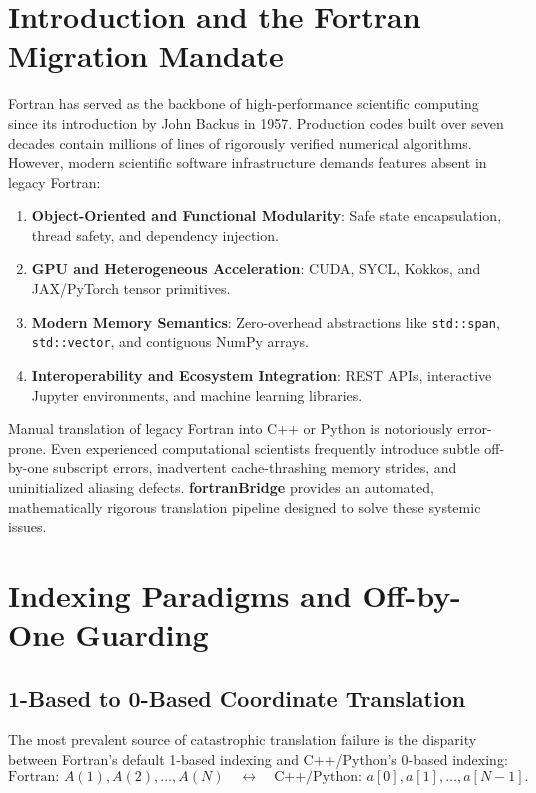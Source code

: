 \documentclass[11pt,a4paper]{article}
\theoremstyle{definition}
\begin{document}
\section{Introduction and the Fortran Migration Mandate}

Fortran has served as the backbone of high-performance scientific computing since its introduction by John Backus in 1957. Production codes built over seven decades contain millions of lines of rigorously verified numerical algorithms. However, modern scientific software infrastructure demands features absent in legacy Fortran:
\begin{enumerate}
    \item \textbf{Object-Oriented and Functional Modularity}: Safe state encapsulation, thread safety, and dependency injection.
    \item \textbf{GPU and Heterogeneous Acceleration}: CUDA, SYCL, Kokkos, and JAX/PyTorch tensor primitives.
    \item \textbf{Modern Memory Semantics}: Zero-overhead abstractions like \texttt{std::span}, \texttt{std::vector}, and contiguous NumPy arrays.
    \item \textbf{Interoperability and Ecosystem Integration}: REST APIs, interactive Jupyter environments, and machine learning libraries.
\end{enumerate}

Manual translation of legacy Fortran into C++ or Python is notoriously error-prone. Even experienced computational scientists frequently introduce subtle off-by-one subscript errors, inadvertent cache-thrashing memory strides, and uninitialized aliasing defects. \textbf{fortranBridge} provides an automated, mathematically rigorous translation pipeline designed to solve these systemic issues.

\section{Indexing Paradigms and Off-by-One Guarding}

\subsection{1-Based to 0-Based Coordinate Translation}
The most prevalent source of catastrophic translation failure is the disparity between Fortran's default 1-based indexing and C++/Python's 0-based indexing:
\begin{equation}
    \text{Fortran: } A(1), A(2), \dots, A(N) \quad \longleftrightarrow \quad \text{C++/Python: } a[0], a[1], \dots, a[N-1].
\end{equation}
\end{document}

